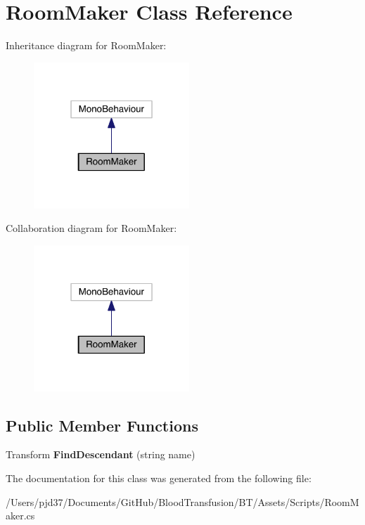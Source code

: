 \hypertarget{class_room_maker}{}\section{Room\+Maker Class Reference}
\label{class_room_maker}


Inheritance diagram for Room\+Maker\+:\nopagebreak
\begin{figure}[H]
\begin{center}
\leavevmode
\includegraphics[width=166pt]{class_room_maker__inherit__graph}
\end{center}
\end{figure}


Collaboration diagram for Room\+Maker\+:\nopagebreak
\begin{figure}[H]
\begin{center}
\leavevmode
\includegraphics[width=166pt]{class_room_maker__coll__graph}
\end{center}
\end{figure}
\subsection*{Public Member Functions}
\begin{DoxyCompactItemize}
\item 
Transform {\bfseries Find\+Descendant} (string name)\hypertarget{class_room_maker_a4aedb8cf8614d5cc728f936a264c9953}{}\label{class_room_maker_a4aedb8cf8614d5cc728f936a264c9953}

\end{DoxyCompactItemize}


The documentation for this class was generated from the following file\+:\begin{DoxyCompactItemize}
\item 
/\+Users/pjd37/\+Documents/\+Git\+Hub/\+Blood\+Transfusion/\+B\+T/\+Assets/\+Scripts/Room\+Maker.\+cs\end{DoxyCompactItemize}
